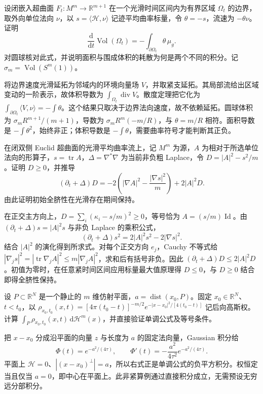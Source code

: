 \begin{exercise}\label{g3:ex:mcf-enclosed-volume}
	设闭嵌入超曲面 \(F_t:M^m\to\mathbb R^{m+1}\) 在一个光滑时间区间内为有界区域 \(\Omega_t\) 的边界，取外向单位法向 \(\nu\)，以 \(s=\langle\mathcal H,\nu\rangle\) 记迹平均曲率标量，令 \(\theta=-s\)，流速为 \(-\theta\nu\)。证明
	\[
		\frac{\mathrm d}{\mathrm dt}\operatorname{Vol}(\Omega_t)
		=-\int_{\partial\Omega_t}\theta\,\mu_g.
	\]
	对圆球核对此式，并说明面积与围成体积的耗散为何是两个不同的积分。记 \(\sigma_m=\operatorname{Vol}(S^m(1))\)。
\end{exercise}
\begin{solution}
	将边界速度光滑延拓为邻域内的环境向量场 \(V\)，并取紧支延拓。其局部流给出区域变动的一阶表示，故体积导数为 \(\int_{\Omega_t}\operatorname{div}V\)。散度定理把它化为 \(\int_{\partial\Omega_t}\langle V,\nu\rangle=-\int\theta\)。这个结果只取决于边界法向速度，故不依赖延拓。圆球体积为 \(\sigma_m R^{m+1}/(m+1)\)，导数为 \(\sigma_mR^m(-m/R)\)，与 \(\theta=m/R\) 相符。面积导数是 \(-\int\theta^2\)，始终非正；体积导数是 \(-\int\theta\)，需要曲率符号才能判断其正负。
\end{solution}

\begin{exercise}\label{g3:ex:mcf-umbilic-defect}
	在闭双侧 Euclid 超曲面的光滑平均曲率流上，记 \(M^m\) 为源，\(A\) 为相对于所选单位法向的形算子，\(s=\operatorname{tr}A\)，\(\Delta=\nabla^*\nabla\) 为当前非负粗 Laplace，令 \(D=|A|^2-s^2/m\)。证明 \(D\ge0\)，并推导
	\[
		(\partial_t+\Delta)D
		=-2\left(|\nabla A|^2-\frac{|\nabla s|^2}{m}\right)+2|A|^2D.
	\]
	由此证明初始全脐性在光滑存在期间保持。
\end{exercise}
\begin{solution}
	在正交主方向上，\(D=\sum_i(\kappa_i-s/m)^2\ge0\)，等号恰为 \(A=(s/m)\operatorname{Id}\)。由 \((\partial_t+\Delta)s=|A|^2s\) 与非负 Laplace 的乘积公式，
	\[
		(\partial_t+\Delta)s^2=2|A|^2s^2-2|\nabla s|^2.
	\]
	结合 \(|A|^2\) 的演化得到所求式。对每个正交方向 \(e_j\)，Cauchy 不等式给 \(|\nabla_j s|^2=|\operatorname{tr}\nabla_jA|^2\le m|\nabla_jA|^2\)，求和后有括号非负。因此 \((\partial_t+\Delta)D\le2|A|^2D\)。初值为零时，在任意紧时间区间应用标量最大值原理得 \(D\le0\)，与 \(D\ge0\) 结合即得全脐性保持。
\end{solution}

\begin{exercise}\label{g3:ex:mcf-plane-gaussian}
	设 \(P\subset\mathbb R^N\) 是一个静止的 \(m\) 维仿射平面，\(a=\operatorname{dist}(x_0,P)\)。固定 \(x_0\in\mathbb R^N\)、\(t<t_0\)，以 \(\rho_{x_0,t_0}(x,t)=[4\pi(t_0-t)]^{-m/2}e^{-|x-x_0|^2/[4(t_0-t)]}\) 记后向高斯权。计算 \(\int_P\rho_{x_0,t_0}(x,t)\,\mathrm d\mathcal H^m(x)\)，并直接验证单调公式及等号条件。
\end{exercise}
\begin{solution}
	把 \(x-x_0\) 分成沿平面的向量 \(z\) 与长度为 \(a\) 的固定法向量，Gaussian 积分给
	\[
		\Phi(t)=e^{-a^2/(4\tau)},\qquad
		\Phi'(t)=-\frac{a^2}{4\tau^2}e^{-a^2/(4\tau)}.
	\]
	平面上 \(\mathcal H=0\)、\(|(x-x_0)^\perp|=a\)，所以右式正是单调公式的负平方积分。权恒定当且仅当 \(a=0\)，即中心在平面上。此非紧算例通过直接积分成立，无需预设无穷远分部积分。
\end{solution}

